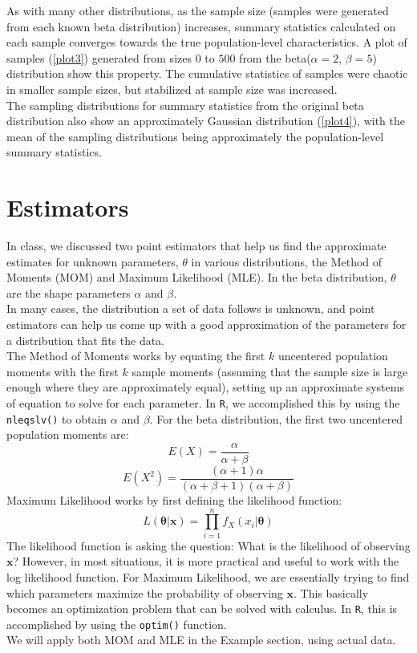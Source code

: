 \documentclass{article}\usepackage[]{graphicx}\usepackage[]{xcolor}
\begin{document}
\begin{multicols}{2}
\indent As with many other distributions, as the sample size (samples were generated from each known beta distribution) increases, summary statistics calculated on each sample converges towards the true population-level characteristics. A plot of samples (\autoref{plot3}) generated from sizes $0$ to $500$ from the beta($\alpha = 2$, $\beta = 5$) distribution show this property. The cumulative statistics \citep{cumstats} of samples were chaotic in smaller sample sizes, but stabilized at sample size was increased.\\ 
\indent The sampling distributions for summary statistics from the original beta distribution also show an approximately Gaussian distribution (\autoref{plot4}), with the mean of the sampling distributions being approximately the population-level summary statistics.

\section{Estimators}
In class, we discussed two point estimators that help us find the approximate estimates for unknown parameters, $\theta$ in various distributions, the Method of Moments (MOM) and Maximum Likelihood (MLE). In the beta distribution, $\theta$ are the shape parameters $\alpha$ and $\beta$. \\
\indent In many cases, the distribution a set of data follows is unknown, and point estimators can help us come up with a good approximation of the parameters for a distribution that fits the data. \\
\indent The Method of Moments works by equating the first $k$ uncentered population moments with the first $k$ sample moments (assuming that the sample size is large enough where they are approximately equal), setting up an approximate systems of equation to solve for each parameter. In \texttt{R}, we accomplished this by using the \verb|nleqslv()| \citep{nleqslv} to obtain $\alpha$ and $\beta$. For the beta distribution, the first two uncentered population moments are: 
\[E(X) = \frac{\alpha}{\alpha + \beta}\]
\[E(X^2) = \frac{(\alpha + 1)\alpha}{(\alpha + \beta + 1)(\alpha + \beta)}\]
\indent Maximum Likelihood works by first defining the likelihood function: 
\[L(\bm{\theta} | \mathbf{x}) = \prod_{i=1}^{n} f_X(x_i | \bm{\theta})\]
The likelihood function is asking the question: What is the likelihood of observing $\mathbf{x}$? However, in most situations, it is more practical and useful to work with the log likelihood function. For Maximum Likelihood, we are essentially trying to find which parameters maximize the probability of observing $\mathbf{x}$. This basically becomes an optimization problem that can be solved with calculus. In \texttt{R}, this is accomplished by using the \verb|optim()| function. \\
\indent We will apply both MOM and MLE in the Example section, using actual data. 


\end{multicols}
\end{document}
